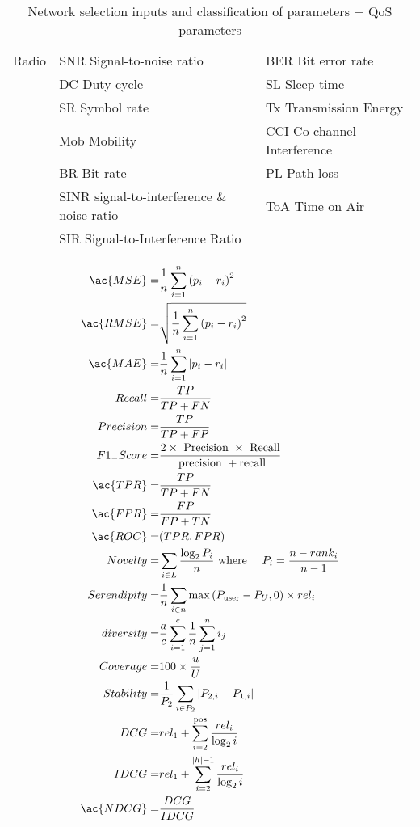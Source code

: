 \begin{table}[h]
\begin{tabular}{l|l|l}
	Radio 				       			& \ac{SNR} Signal-to-noise ratio						  &	\ac{BER} Bit error rate							\\
	\							        & \ac{DC} Duty cycle                            		  & \ac{SL} Sleep time              		        \\
	\							        & \ac{SR} Symbol rate									  &	\ac{Tx} Transmission Energy   					\\
	\							        & \ac{Mob} Mobility										  & \ac{CCI} Co-channel Interference				\\
	\							        & \ac{BR} Bit rate								  		  &	\ac{PL} Path loss								\\
	\									& \ac{SINR} signal-to-interference \& noise ratio 	 	  & \ac{ToA}  Time on Air							\\
	\									& \ac{SIR} Signal-to-Interference Ratio 				  & 												\\
	\end{tabular}
\caption{\label{tab:scheduling} Network selection inputs and classification of parameters \cite{bendaoud_network_2019} + QoS parameters \cite{meshinchi_qosaware_2018} \cite{chowdhury_survey_2018}}
\end{table}

\cite{fakhfakh_deep_2017}
\begin{align}
\ac{MSE}=         & \frac{1}{n} \sum_{i=1}^{n}\left(p_{i}-r_{i}\right)^{2} \\
\ac{RMSE}=        & \sqrt{\frac{1}{n} \sum_{i=1}^{n}\left(p_{i}-r_{i}\right)^{2}} \\
\ac{MAE}=         & \frac{1}{n} \sum_{i=1}^{n}\left|p_{i}-r_{i}\right| \\
Recall=      & \frac{T P}{T P+F N} \\
Precision=   & \frac{T P}{T P+F P} \\
F1_{-}Score= & \frac{2 \times \text { Precision } \times \text { Recall}}{\text { precision }+\text {recall}} \\
\ac{TPR} =        & \frac{T P}{T P+F N} \\
\ac{FPR} =        & \frac{F P}{F P+T N} \\
\ac{ROC}=& (TPR,FPR)\\
Novelty=     & \sum_{i \in L} \frac{\log _{2} P_{i}}{n} \text { where } \quad P_{i}=\frac{n-r a n k_{i}}{n-1} \\
Serendipity= & \frac{1}{n} \sum_{i \in n} \max \left(P_{\text {user}}-P_{U}, 0\right) \times r e l_{i} \\
diversity=   & \frac{a}{c} \sum_{i=1}^{c} \frac{1}{n} \sum_{j=1}^{n} i_{j} \\
Coverage=    & 100 \times \frac{u}{U} \\
Stability=   & \frac{1}{P_{2}} \sum_{i \in P_{2}}\left|P_{2, i}-P_{1, i}\right| \\
DCG=         & r e l_{1}+\sum_{i=2}^{\text {pos}} \frac{r e l_{i}}{\log _{2} i} \\
IDCG=        & r e l_{1}+\sum_{i=2}^{|h|-1} \frac{r e l_{i}}{\log _{2} i} \\
\ac{NDCG}=        & \frac{D C G}{I D C G} \\
\end{align}


